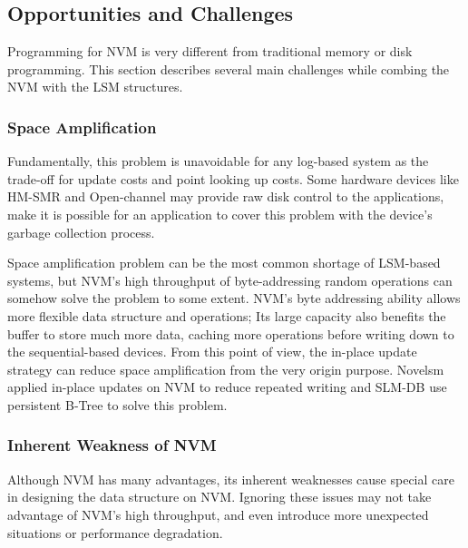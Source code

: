 \subsection{Opportunities and Challenges}

Programming for NVM is very different from traditional memory or disk programming. This section describes several main challenges while combing the NVM with the LSM structures.


\subsubsection{Space Amplification}
Fundamentally, this problem is unavoidable for any log-based system as the trade-off for update costs and point looking up costs. Some hardware devices like HM-SMR and Open-channel may provide raw disk control to the applications, make it is possible for an application to cover this problem with the device's garbage collection process\cite{zhang2017flashkv}.

Space amplification problem can be the most common shortage of LSM-based systems, but NVM's high throughput of byte-addressing random operations can somehow solve the problem to some extent. NVM's byte addressing ability allows more flexible data structure and operations; Its large capacity also benefits the buffer to store much more data, caching more operations before writing down to the sequential-based devices. From this point of view, the in-place update strategy can reduce space amplification from the very origin purpose. Novelsm\cite{kannan2018redesigning} applied in-place updates on NVM to reduce repeated writing and SLM-DB use persistent B-Tree to solve this problem.


%

\subsubsection{Inherent Weakness of NVM}
Although NVM has many advantages, its inherent weaknesses cause special care in designing the data structure on NVM. Ignoring these issues may not take advantage of NVM's high throughput, and even introduce more unexpected situations or performance degradation.

